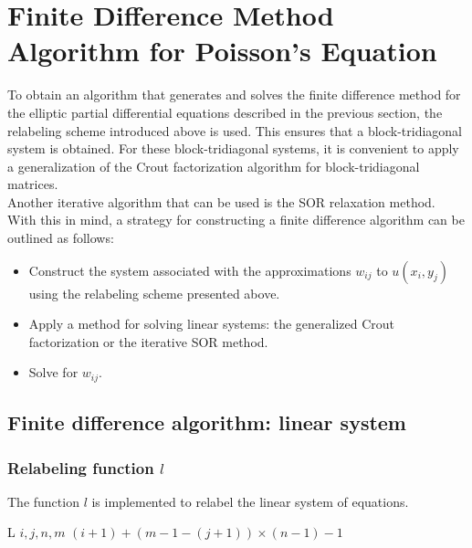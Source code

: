 \documentclass[a4paper]{article}
\begin{document}
\section{Finite Difference Method Algorithm for Poisson's Equation}
To obtain an algorithm that generates and solves the finite difference method for the elliptic partial differential equations described in the previous section, the relabeling scheme introduced above is used. This ensures that a block-tridiagonal system is obtained. For these block-tridiagonal systems, it is convenient to apply a generalization of the Crout factorization algorithm \cite{Varga} for block-tridiagonal matrices.\\
Another iterative algorithm that can be used is the SOR relaxation method. With this in mind, a strategy for constructing a finite difference algorithm can be outlined as follows:
\begin{itemize}
\item Construct the system associated with the approximations $w_{ij}$ to $u(x_i,y_j)$ using the relabeling scheme presented above.
\item Apply a method for solving linear systems: the generalized Crout factorization or the iterative SOR method.
\item Solve for $w_{ij}$.
\end{itemize}

\subsection{Finite difference algorithm: linear system}
\subsubsection{Relabeling function $l$}
The function $l$ is implemented to relabel the linear system of equations.
\begin{algorithm}[H]
\caption{Function $L$ for relabeling the variables of the linear system}\label{alg::funcL}
\begin{algorithmic}[H]
\Function L {$i, j, n, m$}
\State \Return $(i+1) + (m-1-(j+1)) \times (n-1) - 1$
\EndFunction
\end{algorithmic}
\end{algorithm}
\end{document}
